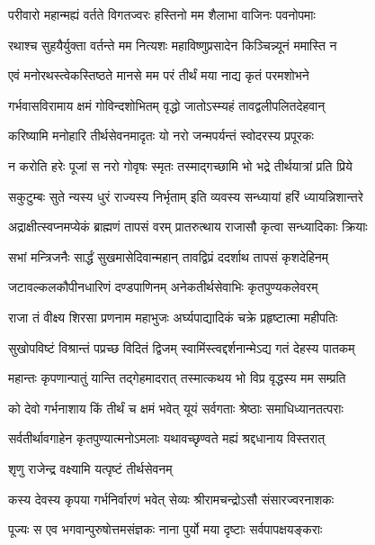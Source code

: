 \twolineshloka
{परीवारो महान्मह्यं वर्तते विगतज्वरः}
{हस्तिनो मम शैलाभा वाजिनः पवनोपमाः}%

\twolineshloka
{रथाश्च सुहयैर्युक्ता वर्तन्ते मम नित्यशः}
{महाविष्णुप्रसादेन किञ्चिन्न्यूनं ममास्ति न}%

\twolineshloka
{एवं मनोरथस्त्वेकस्तिष्ठते मानसे मम}
{परं तीर्थं मया नाद्य कृतं परमशोभने}%

\twolineshloka
{गर्भवासविरामाय क्षमं गोविन्दशोभितम्}
{वृद्धो जातोऽस्म्यहं तावद्वलीपलितदेहवान्}%

\twolineshloka
{करिष्यामि मनोहारि तीर्थसेवनमादृतः}
{यो नरो जन्मपर्यन्तं स्वोदरस्य प्रपूरकः}%

\twolineshloka
{न करोति हरेः पूजां स नरो गोवृषः स्मृतः}
{तस्माद्गच्छामि भो भद्रे तीर्थयात्रां प्रति प्रिये}%

\twolineshloka
{सकुटुम्बः सुते न्यस्य धुरं राज्यस्य निर्भृताम्}
{इति व्यवस्य सन्ध्यायां हरिं ध्यायन्निशान्तरे}%

\twolineshloka
{अद्राक्षीत्स्वप्नमप्येकं ब्राह्मणं तापसं वरम्}
{प्रातरुत्थाय राजासौ कृत्वा सन्ध्यादिकाः क्रियाः}%

\twolineshloka
{सभां मन्त्रिजनैः सार्द्धं सुखमासेदिवान्महान्}
{तावद्विप्रं ददर्शाथ तापसं कृशदेहिनम्}%

\twolineshloka
{जटावल्कलकौपीनधारिणं दण्डपाणिनम्}
{अनेकतीर्थसेवाभिः कृतपुण्यकलेवरम्}%

\twolineshloka
{राजा तं वीक्ष्य शिरसा प्रणनाम महाभुजः}
{अर्घ्यपाद्यादिकं चक्रे प्रहृष्टात्मा महीपतिः}%

\twolineshloka
{सुखोपविष्टं विश्रान्तं पप्रच्छ विदितं द्विजम्}
{स्वामिंस्त्वद्दर्शनान्मेऽद्य गतं देहस्य पातकम्}%

\twolineshloka
{महान्तः कृपणान्पातुं यान्ति तद्गेहमादरात्}
{तस्मात्कथय भो विप्र वृद्धस्य मम सम्प्रति}%

\twolineshloka
{को देवो गर्भनाशाय किं तीर्थं च क्षमं भवेत्}
{यूयं सर्वगताः श्रेष्ठाः समाधिध्यानतत्पराः}%

\twolineshloka
{सर्वतीर्थावगाहेन कृतपुण्यात्मनोऽमलाः}
{यथावच्छृण्वते मह्यं श्रद्दधानाय विस्तरात्}%



\onelineshloka
{शृणु राजेन्द्र वक्ष्यामि यत्पृष्टं तीर्थसेवनम्}%

\twolineshloka
{कस्य देवस्य कृपया गर्भनिर्वारणं भवेत्}
{सेव्यः श्रीरामचन्द्रोऽसौ संसारज्वरनाशकः}%

\twolineshloka
{पूज्यः स एव भगवान्पुरुषोत्तमसंज्ञकः}
{नाना पुर्यो मया दृष्टाः सर्वपापक्षयङ्कराः}%


